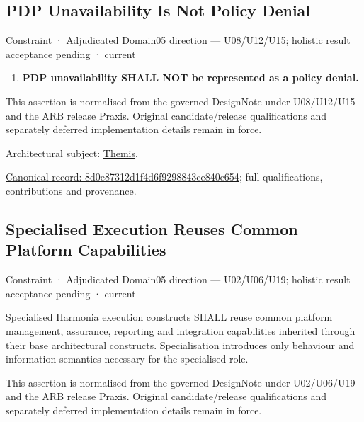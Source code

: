 \subsection{PDP Unavailability Is Not Policy Denial}

\label{element:8d0e87312d1f4d6f9298843ce840e654}
{\small Constraint · Adjudicated Domain05 direction — U08/U12/U15; holistic result acceptance pending · current}\par

\begin{enumerate}


\item \textbf{PDP unavailability SHALL NOT be represented as a policy denial.}

\end{enumerate}


This assertion is normalised from the governed DesignNote under U08/U12/U15 and the ARB release Praxis. Original candidate/release qualifications and separately deferred implementation details remain in force.



Architectural subject: \hyperref[element:899d34ec491948b68aad09e507dea6d1]{Themis}.


{\footnotesize \href{../../../../continuum/motivation/constraint/8d0e87312d1f4d6f9298843ce840e654.md}{Canonical record: 8d0e87312d1f4d6f9298843ce840e654}; full qualifications, contributions and provenance.}\par
\subsection{Specialised Execution Reuses Common Platform Capabilities}

\label{element:968e208d336c48b781a4eabd76e6337b}
{\small Constraint · Adjudicated Domain05 direction — U02/U06/U19; holistic result acceptance pending · current}\par

Specialised Harmonia execution constructs SHALL reuse common platform management, assurance, reporting and integration capabilities inherited through their base architectural constructs. Specialisation introduces only behaviour and information semantics necessary for the specialised role.



This assertion is normalised from the governed DesignNote under U02/U06/U19 and the ARB release Praxis. Original candidate/release qualifications and separately deferred implementation details remain in force.



